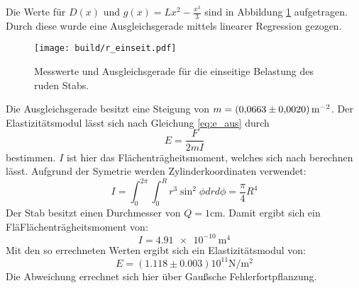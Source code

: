 \noindent Die Werte für $D(x)$ und $g(x)=Lx^2-\frac{x^3}{3}$ sind in Abbildung \ref{fig:plot1} aufgetragen.
Durch diese wurde eine Ausgleichsgerade mittels linearer Regression gezogen.
\begin{figure}
    \centering
    \texttt{[image: build/r\_einseit.pdf]}
    \caption{Messwerte und Ausgleichsgerade für die einseitige Belastung des ruden Stabs.}
    \label{fig:plot1}
\end{figure}
%
Die Ausgleichsgerade besitzt eine Steigung von $m=\SI[per-mode=reciprocal]{0.0663\pm 0.002}{\per\meter\squared}$.
Der Elastizitätsmodul lässt sich nach Gleichung \eqref{eq:e_aus} durch
\begin{equation}
  E=\frac{F}{2mI}
\end{equation}
bestimmen.
$I$ ist hier das Flächenträgheitsmoment, welches sich nach berechnen lässt.
Aufgrund der Symetrie werden Zylinderkoordinaten verwendet:
\begin{equation}
  I=\int_0^{2\pi} \int_0^R r^3 \sin^2{\phi} dr d\phi=\frac{\pi}{4}R^4
\end{equation}
Der Stab besitzt einen Durchmesser von $Q=1\si{\centi\meter}$.
Damit ergibt sich ein FläFlächenträgheitsmoment von:
\begin{equation*}
  I=\SI{4.91e-10}{\meter\tothe{4}}
\end{equation*}
Mit den so errechneten Werten ergibt sich ein Elastizitätsmodul von:
\begin{equation*}
  E=(1.118\pm0.003)10^{11}\si{\newton\per\meter\squared}
\end{equation*}
Die Abweichung errechnet sich hier über Gaußsche Fehlerfortpflanzung.
